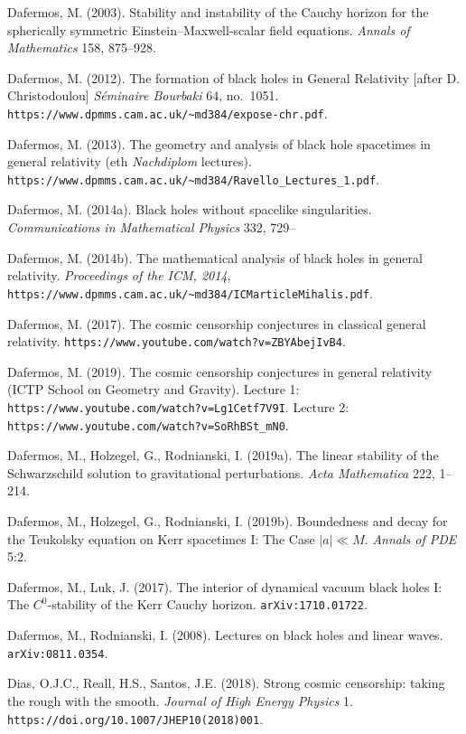 \documentclass[11pt,a4paper]{article}
\begin{document}
\begin{small}
\begin{thebibliography}{99}
 \item[] Dafermos, M. (2003). Stability and instability of the Cauchy horizon for the spherically symmetric Einstein--Maxwell-scalar field equations. \emph{Annals of Mathematics} 158, 875--928. 
 \item[] Dafermos, M. (2012). The formation of black holes in General Relativity [after D. Christodoulou]
\emph{S\'{e}minaire Bourbaki} 64, no.\ 1051. \verb#https://www.dpmms.cam.ac.uk/~md384/expose-chr.pdf#.
 \item[] Dafermos, M. (2013). The geometry and analysis of black hole spacetimes in general relativity ({\sc eth} \emph{Nachdiplom} lectures). \verb#https://www.dpmms.cam.ac.uk/~md384/Ravello_Lectures_1.pdf#.
  \item[] Dafermos, M. (2014a). Black holes without spacelike singularities. 
   \emph{Communications in Mathematical Physics} 332, 729--
 \item[] Dafermos, M. (2014b). The mathematical analysis of black holes in general relativity. 
\emph{Proceedings of the ICM, 2014}, \verb#https://www.dpmms.cam.ac.uk/~md384/ICMarticleMihalis.pdf#.
 \item[] Dafermos, M. (2017). The cosmic censorship conjectures in classical general relativity. \verb#https://www.youtube.com/watch?v=ZBYAbejIvB4#.
  \item[] Dafermos, M. (2019).
 The cosmic censorship conjectures in general relativity  (ICTP School on Geometry and Gravity). 
  Lecture 1:  \verb#https://www.youtube.com/watch?v=Lg1Cetf7V9I#. 
Lecture 2:  \verb#https://www.youtube.com/watch?v=SoRhBSt_mN0#.
  \item[] Dafermos, M., Holzegel, G., Rodnianski, I. (2019a).
  The linear stability of the Schwarzschild solution to gravitational perturbations. \emph{Acta Mathematica} 222, 1--214. 
    \item[] Dafermos, M., Holzegel, G., Rodnianski, I. (2019b).
Boundedness and decay for the Teukolsky equation on Kerr spacetimes I: The Case $|a|\ll M$. 
\emph{Annals of PDE} 5:2. 
  \item[] Dafermos, M., Luk, J. (2017). The interior of dynamical vacuum black holes I: The $C^0$-stability of the Kerr Cauchy horizon. \texttt{arXiv:1710.01722}.
  \item[] Dafermos, M., Rodnianski, I. (2008). Lectures on black holes and linear waves. \texttt{arXiv:0811.0354}.
  \item[] 
Dias, O.J.C.,  Reall, H.S., Santos, J.E. (2018).
 Strong cosmic censorship: taking the rough with the smooth. \emph{Journal of High Energy Physics} 1. \verb#https://doi.org/10.1007/JHEP10(2018)001#.

\end{thebibliography}
\end{small}
\end{document}
